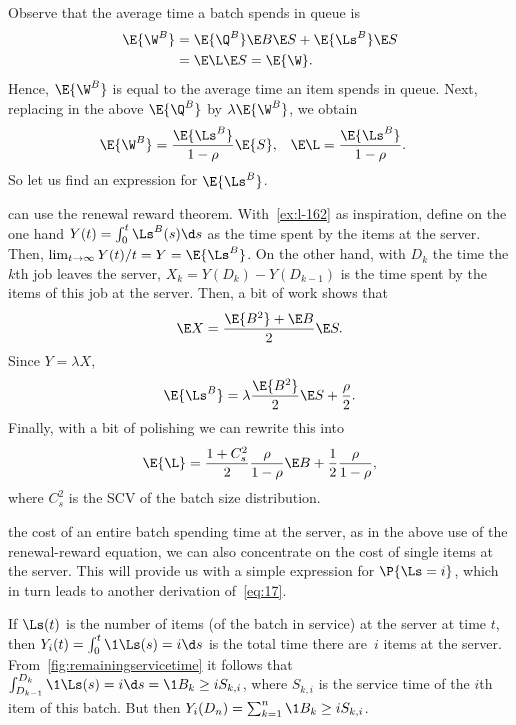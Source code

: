 Observe that the average time a batch spends in queue is 
\begin{align*}
  \E{\W^B} &= \E{\Q^B} \E B \E S + \E{\Ls^B}\E S \\
&=  \E\L \E S = \E{\W}.
\end{align*}
Hence, $\E{\W^B}$ is equal to  the average time an item spends in queue.
Next, replacing in the above  $\E{\Q^B}$ by $\lambda \E{\W^B}$, we obtain
\begin{align}\label{eq:96}
 \E{\W^B} &= \frac{\E{\Ls^B}}{1-\rho}\E{S}, &  \E\L  &= \frac{\E{\Ls^B}}{1-\rho}. 
\end{align}
So let us find an expression for $\E{\Ls^B}$.

 can use the renewal reward theorem.
With~\cref{ex:l-162} as inspiration,
define on the one hand $Y(t) = \int_0^t \Ls^B(s) \d s$ as the time spent by the items at the server.
Then, $\lim_{t\to\infty} Y(t)/t = Y = \E{\Ls^B}$.
On the other hand, with $D_k$ the time the $k$th job leaves the server, $X_k = Y(D_k)-Y(D_{k-1})$ is the time spent by the items of this job at the server.
Then, a bit of work shows that
\begin{equation}\label{eq:9}
  \E X = \frac{\E{B^2}+\E B}2 \E S.
\end{equation}
Since $Y=\lambda X$, 
\begin{equation}\label{eq:17}
  \E{\Ls^B} = \lambda \frac{\E{B^2}}2\E S + \frac\rho 2.
\end{equation}
Finally, with a bit of polishing we can rewrite this into
\begin{equation}\label{eq:43}
\E{\L} = %
\frac{1+C_s^2}2 \frac{\rho}{1-\rho} \E B  + \frac12\frac\rho{1-\rho},
\end{equation}
where $C_s^2$ is the SCV of the batch size distribution. 


 the cost of an entire batch spending time at the server, as in the above use of the renewal-reward equation, we can also concentrate on the cost of single items at the server.
This will provide us with a simple expression for $\P{\Ls=i}$, which in turn leads to another derivation of~\cref{eq:17}.

If $\Ls(t)$ is the number of items (of the batch in service) at the server at time $t$, then $Y_i(t) = \int_0^t \1{\Ls(s)=i} \d s$ is the total time there are~$i$ items at the server.
From~\cref{fig:remainingservicetime} it follows that
$\int_{ D_{k-1}}^{D_k} \1{\Ls(s)=i} \d s = \1{B_k \geq i} S_{k,i}$,
where $S_{k,i}$ is the service time of the $i$th item of this batch. But then
$Y_i(D_n) = \sum_{k=1}^n \1{B_k\geq i} S_{k,i}$. 


